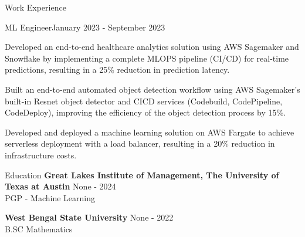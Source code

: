\documentclass{resume} %
\begin{document}
\begin{rSection}{Work Experience}
                    \begin{rSubsection}
                {ML Engineer}{January 2023 - September 2023}
                                    {}
                                {}
                                    \item Developed an end{-}to{-}end healthcare analytics solution using AWS Sagemaker and Snowflake by implementing a complete MLOPS pipeline (CI/CD) for real{-}time predictions, resulting in a 25\% reduction in prediction latency.
                                    \item Built an end{-}to{-}end automated object detection workflow using AWS Sagemaker's built{-}in Resnet object detector and CICD services (Codebuild, CodePipeline, CodeDeploy), improving the efficiency of the object detection process by 15\%.
                                    \item Developed and deployed a machine learning solution on AWS Fargate to achieve serverless deployment with a load balancer, resulting in a 20\% reduction in infrastructure costs.
                            \end{rSubsection}
            \end{rSection}

\begin{rSection}{Education}
                        \textbf{Great Lakes Institute of Management, The University of Texas at Austin} \hfill {None - 2024} \\
                            {PGP {-} Machine Learning}
                         
             
         
                        \textbf{West Bengal State University} \hfill {None - 2022} \\
                            {B.SC Mathematics}
                         
             
         
    \end{rSection}
\end{document}
